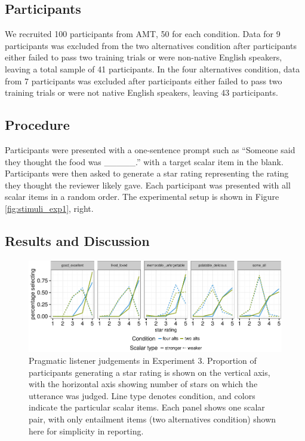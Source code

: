 \documentclass[10pt, letterpaper]{article}
\newenvironment{CodeChunk}{}{}
\begin{document}
\subsection{Participants}\label{participants-2}

We recruited 100 participants from AMT, 50 for each condition. Data for
9 participants was excluded from the two alternatives condition after
participants either failed to pass two training trials or were
non-native English speakers, leaving a total sample of 41 participants.
In the four alternatives condition, data from 7 participants was
excluded after participants either failed to pass two training trials or
were not native English speakers, leaving 43 participants.

\subsection{Procedure}\label{procedure}

Participants were presented with a one-sentence prompt such as ``Someone
said they thought the food was \_\_\_\_\_.'' with a target scalar item
in the blank. Participants were then asked to generate a star rating
representing the rating they thought the reviewer likely gave. Each
participant was presented with all scalar items in a random order. The
experimental setup is shown in Figure \ref{fig:stimuli_exp1}, right.

\subsection{Results and Discussion}\label{results-and-discussion-2}

\begin{CodeChunk}
\begin{figure}[t]

{\centering \includegraphics{figs/exp2Plots-1} 

}

\caption[Pragmatic listener judgements in Experiment 3]{Pragmatic listener judgements in Experiment 3. Proportion of participants generating a star rating is shown on the vertical axis, with the horizontal axis showing number of stars on which the utterance was judged. Line type denotes condition, and colors indicate the particular scalar items. Each panel shows one scalar pair, with only entailment items (two alternatives condition) shown here for simplicity in reporting.}\label{fig:exp2Plots}
\end{figure}
\end{CodeChunk}
\end{document}
